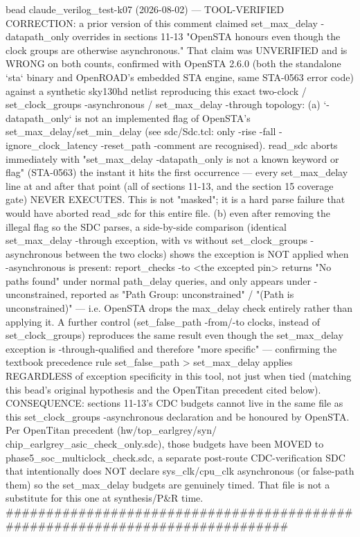 \begin{record}
\begin{textblock}
   bead claude_verilog_test-k07 (2026-08-02) — TOOL-VERIFIED CORRECTION:
   a prior version of this comment claimed set_max_delay -datapath_only
   overrides in sections 11-13 "OpenSTA honours even though the clock
   groups are otherwise asynchronous." That claim was UNVERIFIED and is
   WRONG on both counts, confirmed with OpenSTA 2.6.0 (both the standalone
   `sta` binary and OpenROAD's embedded STA engine, same STA-0563 error
   code) against a synthetic sky130hd netlist reproducing this exact
   two-clock / set_clock_groups -asynchronous / set_max_delay -through
   topology:
     (a) `-datapath_only` is not an implemented flag of OpenSTA's
         set_max_delay/set_min_delay (see sdc/Sdc.tcl: only -rise -fall
         -ignore_clock_latency -reset_path -comment are recognised).
         read_sdc aborts immediately with "set_max_delay -datapath_only
         is not a known keyword or flag" (STA-0563) the instant it hits
         the first occurrence — every set_max_delay line at and after
         that point (all of sections 11-13, and the section 15 coverage
         gate) NEVER EXECUTES. This is not "masked"; it is a hard parse
         failure that would have aborted read_sdc for this entire file.
     (b) even after removing the illegal flag so the SDC parses, a
         side-by-side comparison (identical set_max_delay -through
         exception, with vs without set_clock_groups -asynchronous
         between the two clocks) shows the exception is NOT applied when
         -asynchronous is present: report_checks -to <the excepted pin>
         returns "No paths found" under normal path_delay queries, and
         only appears under -unconstrained, reported as
         "Path Group: unconstrained" / "(Path is unconstrained)" — i.e.
         OpenSTA drops the max_delay check entirely rather than applying
         it. A further control (set_false_path -from/-to clocks, instead
         of set_clock_groups) reproduces the same result even though the
         set_max_delay exception is -through-qualified and therefore
         "more specific" — confirming the textbook precedence rule
         set_false_path > set_max_delay applies REGARDLESS of exception
         specificity in this tool, not just when tied (matching this
         bead's original hypothesis and the OpenTitan precedent cited
         below).
   CONSEQUENCE: sections 11-13's CDC budgets cannot live in the same file
   as this set_clock_groups -asynchronous declaration and be honoured by
   OpenSTA. Per OpenTitan precedent (hw/top_earlgrey/syn/
   chip_earlgrey_asic_check_only.sdc), those budgets have been MOVED to
   phase5_soc_multiclock_check.sdc, a separate post-route CDC-verification
   SDC that intentionally does NOT declare sys_clk/cpu_clk asynchronous
   (or false-path them) so the set_max_delay budgets are genuinely timed.
   That file is not a substitute for this one at synthesis/P&R time.
##############################################################################
\end{textblock}


\end{record}
